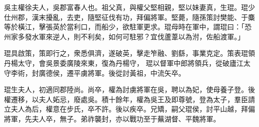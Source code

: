 \begin{pinyinscope}
 
 
 吳主權徐夫人，吳郡富春人也。祖父真，與權父堅相親，堅以妹妻真，生琨。琨少仕州郡，漢末擾亂，去吏，隨堅征伐有功，拜偏將軍。堅薨，隨孫策討樊能、于麋等於橫江，擊張英於當利口，而船少，欲駐軍更求。琨母時在軍中，謂琨曰：「恐州家多發水軍來逆人，則不利矣，如何可駐邪？宜伐蘆葦以為泭，佐船渡軍。」
 
 
 琨具啟策，策即行之，衆悉俱濟，遂破英，擊走笮融、劉繇，事業克定。策表琨領丹楊太守，會吳景委廣陵來東，復為丹楊守，
 琨以督軍中郎將領兵，從破廬江太守李術，封廣德侯，遷平虜將軍。後從討黃祖，中流矢卒。
 
 
 
 
 琨生夫人，初適同郡陸尚。尚卒，權為討虜將軍在吳，聘以為妃，使母養子登。後權遷移，以夫人妬忌，廢處吳。積十餘年，權為吳王及即尊號，登為太子，羣臣請立夫人為后，權意在步氏，卒不許。後以疾卒。兄矯，嗣父琨侯，討平山越，拜偏將軍，先夫人卒，無子。弟祚襲封，亦以戰功至于蕪湖督、平魏將軍。
 
 
\end{pinyinscope}